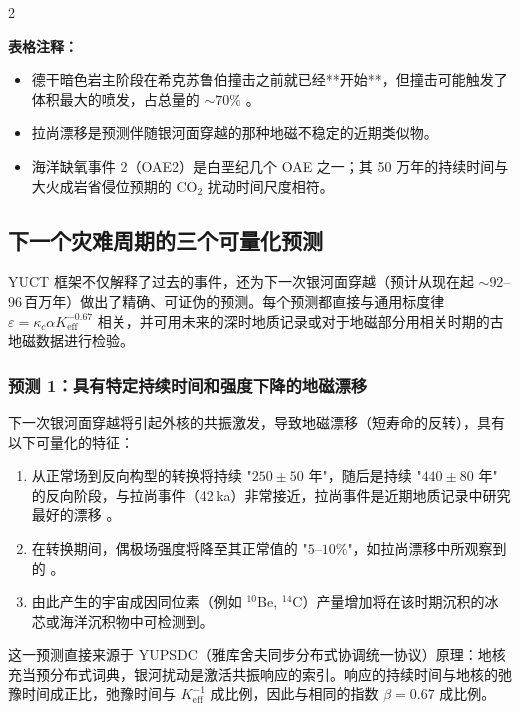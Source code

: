 \documentclass[11pt,a4paper]{article}
\begin{document}
	\begin{multicols}{2}
		
		\noindent
		\textbf{表格注释：}
		\begin{itemize}
			\item 德干暗色岩主阶段在希克苏鲁伯撞击之前就已经**开始**，但撞击可能触发了体积最大的喷发，占总量的 \(\sim 70\%\) \cite{DeccanTriggering}。
			\item 拉尚漂移是预测伴随银河面穿越的那种地磁不稳定的近期类似物。
			\item 海洋缺氧事件 2（OAE2）是白垩纪几个 OAE 之一；其 50 万年的持续时间与大火成岩省侵位预期的 CO\(_2\) 扰动时间尺度相符。
		\end{itemize}
		
		
		\subsection{下一个灾难周期的三个可量化预测}
		
		YUCT 框架不仅解释了过去的事件，还为下一次银河面穿越（预计从现在起 \(\sim 92\)–\(96\) 百万年）做出了精确、可证伪的预测。每个预测都直接与通用标度律 \(\varepsilon = \kappa_c \alpha K_{\mathrm{eff}}^{-0.67}\) 相关，并可用未来的深时地质记录或对于地磁部分用相关时期的古地磁数据进行检验。
		
		\subsubsection{预测 1：具有特定持续时间和强度下降的地磁漂移}
		
		下一次银河面穿越将引起外核的共振激发，导致地磁漂移（短寿命的反转），具有以下可量化的特征：
		
		\begin{enumerate}
			\item 从正常场到反向构型的转换将持续 "\(250 \pm 50\) 年"，随后是持续 "\(440 \pm 80\) 年" 的反向阶段，与拉尚事件（42 ka）非常接近，拉尚事件是近期地质记录中研究最好的漂移 \cite{Laschamp}。
			\item 在转换期间，偶极场强度将降至其正常值的 "\(5\)–\(10\%\)"，如拉尚漂移中所观察到的 \cite{Laschamp}。
			\item 由此产生的宇宙成因同位素（例如 \(^{10}\)Be, \(^{14}\)C）产量增加将在该时期沉积的冰芯或海洋沉积物中可检测到。
		\end{enumerate}
		
		这一预测直接来源于 YUPSDC（雅库舍夫同步分布式协调统一协议）原理：地核充当预分布式词典，银河扰动是激活共振响应的索引。响应的持续时间与地核的弛豫时间成正比，弛豫时间与 \(K_{\mathrm{eff}}^{-1}\) 成比例，因此与相同的指数 \(\beta=0.67\) 成比例。
		

\end{multicols}
\end{document}
